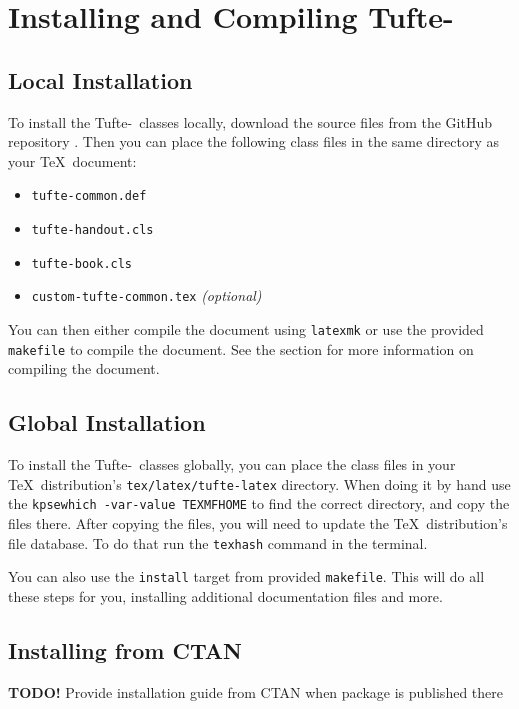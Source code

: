 \documentclass[a4paper]{tufte-book}
\newcommand{\TL}{Tufte-\hologo{LaTeX}\xspace}
\newcommand{\TODO}[1]{\textcolor{tufte-red}{\textbf{TODO!} #1}\xspace}
\begin{document}
\chapter[Installing and Compiling Tufte-LaTeX]{Installing and Compiling \TL}\label{ch:installing-compiling-tufte-latex}
\section{Local Installation}\label{sec:local-installation}
To install the \TL\ classes locally, download the source files from the GitHub repository%
.
Then you can place the following class files in the same directory as your \TeX\ document:
\begin{itemize}
  \item \texttt{tufte-common.def}
  \item \texttt{tufte-handout.cls}
  \item \texttt{tufte-book.cls}
  \item \texttt{custom-tufte-common.tex} \textit{(optional)}
\end{itemize}

You can then either compile the document using \texttt{latexmk} or use the provided \texttt{makefile} to compile the document.
See the  section for more information on compiling the document.


\section{Global Installation}\label{sec:global-installation}
To install the \TL\ classes globally, you can place the class files in your \TeX\ distribution's \texttt{tex/latex/tufte-latex} directory.
When doing it by hand use the \texttt{kpsewhich -var-value TEXMFHOME} to find the correct directory, and copy the files there.
After copying the files, you will need to update the \TeX\ distribution's file database.
To do that run the \texttt{texhash} command in the terminal.

You can also use the \texttt{install} target from provided \texttt{makefile}.
This will do all these steps for you, installing additional documentation files and more.


\section{Installing from CTAN}\label{sec:installing-from-ctan}
\TODO{Provide installation guide from CTAN when package is published there}
\end{document}
